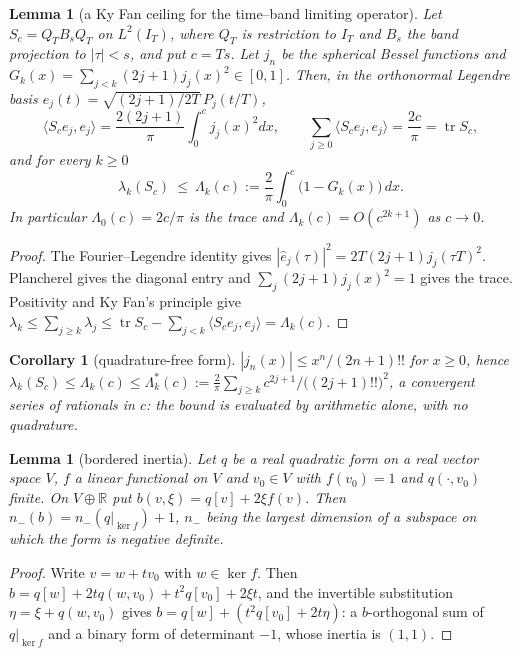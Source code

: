 \documentclass[10pt]{amsart}
\newtheorem{lemma}[theorem]{Lemma}
\newtheorem{corollary}[theorem]{Corollary}
\theoremstyle{definition}
\theoremstyle{remark}
\newcommand{\R}{\mathbb R}
\newcommand{\IT}{I_T}
\begin{document}
\begin{lemma}[a Ky Fan ceiling for the time--band limiting operator]\label{lem:KyFan}
Let $S_c=Q_TB_sQ_T$ on $L^2(\IT)$, where $Q_T$ is restriction to $\IT$ and $B_s$ the band projection
to $|\tau|<s$, and put $c=Ts$. Let $j_n$ be the spherical Bessel functions and
$G_k(x)=\sum_{j<k}(2j+1)j_j(x)^2\in[0,1]$. Then, in the orthonormal Legendre basis
$e_j(t)=\sqrt{(2j+1)/2T}\,P_j(t/T)$,
\[
\langle S_ce_j,e_j\rangle=\frac{2(2j+1)}\pi\int_0^cj_j(x)^2dx,\qquad
\sum_{j\ge0}\langle S_ce_j,e_j\rangle=\frac{2c}\pi=\operatorname{tr}S_c ,
\]
and for every $k\ge0$
\[
\lambda_k(S_c)\ \le\ \Lambda_k(c):=\frac2\pi\int_0^c\big(1-G_k(x)\big)\,dx .
\]
In particular $\Lambda_0(c)=2c/\pi$ is the trace and $\Lambda_k(c)=O(c^{2k+1})$ as $c\to0$.
\end{lemma}
\begin{proof}
The Fourier--Legendre identity gives
$|\widehat e_j(\tau)|^2=2T(2j+1)j_j(\tau T)^2$. Plancherel gives
the diagonal entry and $\sum_j(2j+1)j_j(x)^2=1$ gives the trace.
Positivity and Ky Fan's principle give
$\lambda_k\le\sum_{j\ge k}\lambda_j\le\operatorname{tr}S_c-
\sum_{j<k}\langle S_ce_j,e_j\rangle=\Lambda_k(c)$.
\end{proof}

\begin{corollary}[quadrature-free form]\label{cor:P1}
$|j_n(x)|\le x^n/(2n+1)!!$ for $x\ge0$, hence
$\lambda_k(S_c)\le\Lambda_k(c)\le\Lambda^*_k(c):=\frac2\pi\sum_{j\ge k}c^{2j+1}/\big((2j+1)!!\big)^2$, a convergent
series of rationals in $c$: the bound is evaluated by arithmetic alone, with no quadrature.
\end{corollary}


\begin{lemma}[bordered inertia]\label{lem:border}
Let $q$ be a real quadratic form on a real vector space $V$, $f$ a linear functional on
$V$ and $v_0\in V$ with $f(v_0)=1$ and $q(\cdot,v_0)$ finite. On $V\oplus\R$ put
$b(v,\xi)=q[v]+2\xi f(v)$. Then $n_-(b)=n_-(q|_{\ker f})+1$, $n_-$ being the largest dimension of a
subspace on which the form is negative definite.
\end{lemma}
\begin{proof}
Write $v=w+tv_0$ with $w\in\ker f$. Then $b=q[w]+2tq(w,v_0)+t^2q[v_0]+2\xi t$, and the invertible
substitution $\eta=\xi+q(w,v_0)$ gives $b=q[w]+(t^2q[v_0]+2t\eta)$: a $b$-orthogonal sum of
$q|_{\ker f}$ and a binary form of determinant $-1$, whose inertia is $(1,1)$.
\end{proof}
\end{document}
